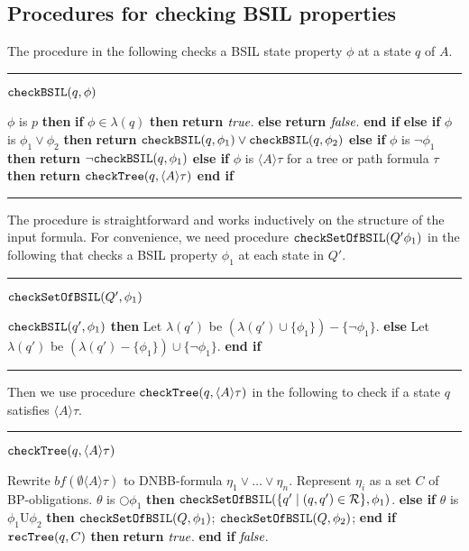 \documentclass[11pt]{article}
\newcommand{\IFNLINE}[1]{\STATE {\bf if} #1 {\bf then} }
\newcommand{\IFLINE}[1]{{\bf if} #1 {\bf then} }
\newcommand{\ELSELINE}{\textbf{else} }
\newcommand{\ELSNLINE}{\STATE \textbf{else} }
\newcommand{\ENDIFLINE}{\textbf{end if}}
\newcommand{\ENDIFNLINE}{\STATE \textbf{end if}}
\newcommand{\ELSIFNLINE}[1]{\STATE \textbf{else if} #1 {\bf then}}
\newcommand{\RETLINE}{\textbf{return} }
\newcommand{\procbegin}{\vspace*{3mm}\hrule\noindent}
\newcommand{\procend}{\vspace*{1mm}\hrule\vspace{3mm}}
\newcommand{\ttchksil}{\mbox{\tt checkBSIL}}
\newcommand{\ttsyntree}{\mbox{\tt checkTree}}
\newcommand{\ttrecsyn}{\mbox{\tt recTree}}
\newcommand{\ttsynset}{\mbox{\tt checkSetOfBSIL}}
\newcommand{\embf}{\textit{bf}}
\newcommand{\calr}{{\cal R}}
\newcommand{\true}{\mbox{\em true}}
\newcommand{\false}{\mbox{\em false}}
\newcommand{\until}{\textrm{U}} %
\newcommand{\nxt}{\bigcirc}
\begin{document}
\subsection{Procedures for checking BSIL properties\label{subsec.alg.proc}}

The procedure in the following 
checks a BSIL state property $\phi$ at a state $q$ of $A$.
\procbegin
$\ttchksil(q,\phi)$
\begin{algorithmic}[1]
\IFNLINE {$\phi$ is $p$}
\label{st.dfstest.cover}
  \IFLINE {$\phi\in\lambda(q)$}
    \RETLINE $\true$.
  \ELSELINE
    \RETLINE $\false$.
  \ENDIFLINE
\ELSIFNLINE{$\phi$ is $\phi_1\vee\phi_2$}
  \RETLINE $\ttchksil(q,\phi_1)
    \vee\ttchksil(q,\phi_2)$
\ELSIFNLINE{$\phi$ is $\neg\phi_1$}
  \RETLINE $\neg\ttchksil(q,\phi_1)$
\ELSIFNLINE{$\phi$ is $\langle A\rangle\tau$ for a tree or path formula $\tau$}
  \RETLINE {$\ttsyntree(q,\langle A\rangle\tau)$}
\ENDIFNLINE
\end{algorithmic}
\procend
The procedure is straightforward and works inductively on the structure
of the input formula.
For convenience, we need procedure $\ttsynset(Q'\phi_1)$
in the following  
that
checks a BSIL property $\phi_1$ at each state in $Q'$.
\procbegin
$\ttsynset(Q',\phi_1)$
\begin{algorithmic}[1]
\IF {$\phi_1\not\in P\cup\{\true,\false\}$}
    \IFNLINE {$\ttchksil(q',\phi_1)$}
      Let $\lambda(q')$ be $(\lambda(q')\cup\{\phi_1\})-\{\neg\phi_1\}$.
    \ELSNLINE 
      Let $\lambda(q')$ be $(\lambda(q')-\{\phi_1\})\cup\{\neg\phi_1\}$.
    \ENDIFLINE 
  \ENDFOR
\ENDIF
\end{algorithmic}
\procend
Then we use procedure $\ttsyntree(q,\langle A\rangle\tau)$ in the following 
to check if a state $q$ satisfies $\langle A\rangle\tau$.
\procbegin
$\ttsyntree(q,\langle A\rangle\tau)$
\begin{algorithmic}[1]
\STATE \label{stmt.syntree.dqnf}
    Rewrite $\embf(\emptyset\langle A\rangle\tau)$ 
    to DNBB-formula $\eta_1\vee\ldots\vee\eta_n$.
 \label{stmt.syntree.loop.conj}
  \STATE Represent $\eta_i$ as a set $C$ of BP-obligations.
    \label{stmt.syntree.loop.sint}
    \label{stmt.syntree.loop.sub}
    \IFNLINE {$\theta$ is $\nxt\phi_1$}
      $\ttsynset(\{q'\mid (q,q')\in \calr\},\phi_1)$.
    \ELSIFNLINE {$\theta$ is $\phi_1\until\phi_2$}
      $\ttsynset(Q,\phi_1)$;
      $\ttsynset(Q,\phi_2)$; 
    \ENDIFLINE 
  \ENDFOR
  \IFNLINE {$\ttrecsyn(q,C)$}
  \label{stmt.syntree.tree.explore}
    \RETLINE $\true$.
  \ENDIFLINE
\ENDFOR
\RETURN $\false$.
\end{algorithmic}
\end{document}
